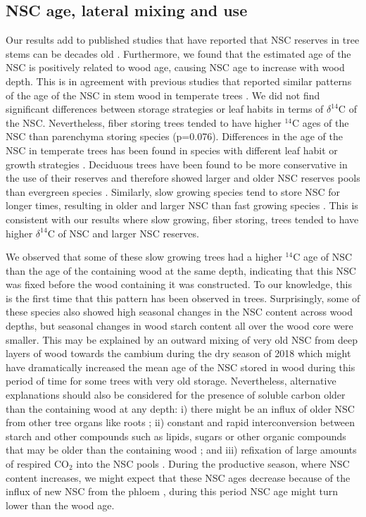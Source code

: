 \documentclass{article}
\begin{document}
\subsection{NSC age, lateral mixing and use}

Our results add to published studies that have reported that NSC reserves in tree stems can be decades old \citep{carbone:2007, carbone:2013, muhr:2013,muhr:2016, Muhr:2018, Richardson:2013aa, Trumbore:2015}. Furthermore, we found that the estimated age of the NSC is positively related to wood age, causing NSC age to increase with wood depth. This is in agreement with previous studies that reported similar patterns of the age of the NSC in stem wood in temperate trees \citep{Richardson:2015, Trumbore:2015, Fuze2020}. We did not find significant differences between storage strategies or leaf habits in terms of $\delta^{14}$C of the NSC. Nevertheless, fiber storing trees tended to have higher $^{14}$C ages of the NSC than parenchyma storing species (p=0.076). Differences in the age of the NSC in temperate trees has been found in species with different leaf habit or growth strategies  \citep{Richardson:2015, Richardson:2013aa}. Deciduous trees have been found to be more conservative in the use of their reserves and therefore showed larger and older NSC reserves pools than evergreen species \citep{Trumbore:2015}. Similarly, slow growing species tend to store NSC for longer times, resulting in older and larger NSC than fast growing species \citep{Richardson:2013aa}. This is consistent with our results where slow growing, fiber storing, trees tended to have higher $\delta^{14}$C of NSC and larger NSC reserves.

We observed that some of these slow growing trees had a higher $^{14}$C age of NSC than the age of the containing wood at the same depth, indicating that this NSC was fixed before the wood containing it was constructed. To our knowledge, this is the first time that this pattern has been observed in trees. Surprisingly, some of these species also showed high seasonal changes in the NSC content across wood depths, but seasonal changes in wood starch content all over the wood core were smaller. This may be explained by an outward mixing of very old NSC from deep layers of wood towards the cambium during the dry season of 2018 which might have dramatically increased the mean age of the NSC stored in wood during this period of time for some trees with very old storage. Nevertheless, alternative explanations should also be considered for the presence of soluble carbon older than the containing wood at any depth: i) there might be an influx of older NSC from other tree organs like roots \citep{klein:2015, Herrera-Ramirez:2020}; ii) constant and rapid interconversion between starch and other compounds such as lipids, sugars or other organic compounds that may be older than the containing wood  \citep{Richardson:2015}; and iii) refixation of large amounts of respired CO$_{2}$ into the NSC pools \citep{Bloemen:2013, Hilman:2019}. During the productive season, where NSC content increases, we might expect that these NSC ages decrease because of the influx of new NSC from the phloem \citep{Dandrea:2019}, during this period NSC age might turn lower than the wood age. 
 
\end{document}
